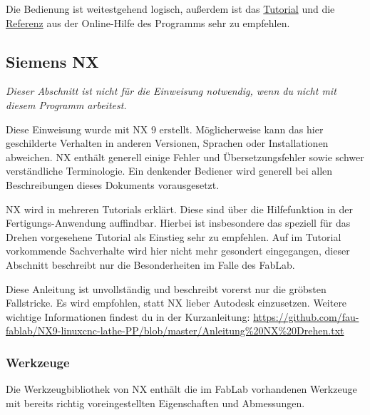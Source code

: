 \documentclass{\basedir/fablab-document}
\begin{document}
Die Bedienung ist weitestgehend logisch, außerdem ist das \href{http://help.autodesk.com/view/INVHSM/2016/DEU/?guid=GUID-56A84DA8-46DB-458A-91FD-41791CE6FABA}{Tutorial} und die \href{http://help.autodesk.com/view/INVHSM/2016/DEU/?guid=GUID-7B7A2457-8EE9-4AE0-839B-6271340A396C}{Referenz} aus der Online-Hilfe des Programms sehr zu empfehlen.

\subsection{Siemens NX}
\emph{Dieser Abschnitt ist nicht für die Einweisung notwendig, wenn du nicht mit diesem Programm arbeitest.}

Diese Einweisung wurde mit NX 9 erstellt. Möglicherweise kann das hier geschilderte Verhalten in anderen Versionen, Sprachen oder Installationen abweichen. NX enthält generell einige Fehler und Übersetzungsfehler sowie schwer verständliche Terminologie. Ein denkender Bediener wird generell bei allen Beschreibungen dieses Dokuments vorausgesetzt.

NX wird in mehreren Tutorials erklärt. Diese sind über die Hilfefunktion in der Fertigungs-Anwendung auffindbar. Hierbei ist insbesondere das speziell für das Drehen vorgesehene Tutorial als Einstieg sehr zu empfehlen. Auf im Tutorial vorkommende Sachverhalte wird hier nicht mehr gesondert eingegangen, dieser Abschnitt beschreibt nur die Besonderheiten im Falle des FabLab.

Diese Anleitung ist unvollständig und beschreibt vorerst nur die gröbsten Fallstricke. Es wird empfohlen, statt NX lieber Autodesk einzusetzen. Weitere wichtige Informationen findest du in der Kurzanleitung: \url{https://github.com/fau-fablab/NX9-linuxcnc-lathe-PP/blob/master/Anleitung%20NX%20Drehen.txt}

\subsubsection{Werkzeuge}
Die Werkzeugbibliothek von NX enthält die im FabLab vorhandenen Werkzeuge mit bereits richtig voreingestellten Eigenschaften und Abmessungen. 


\end{document}
